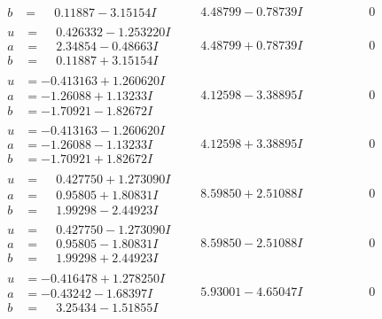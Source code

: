 \documentclass[1p]{elsarticle_modified}
\theoremstyle{definition}
\begin{document}
$$\begin{array}{c|c|c}
\begin{aligned}
b &= \phantom{-}0.11887 - 3.15154 I\end{aligned}
 & \phantom{-}4.48799 - 0.78739 I & \phantom{-0.000000 } 0 \\ \hline\begin{aligned}
u &= \phantom{-}0.426332 - 1.253220 I \\
a &= \phantom{-}2.34854 - 0.48663 I \\
b &= \phantom{-}0.11887 + 3.15154 I\end{aligned}
 & \phantom{-}4.48799 + 0.78739 I & \phantom{-0.000000 } 0 \\ \hline\begin{aligned}
u &= -0.413163 + 1.260620 I \\
a &= -1.26088 + 1.13233 I \\
b &= -1.70921 - 1.82672 I\end{aligned}
 & \phantom{-}4.12598 - 3.38895 I & \phantom{-0.000000 } 0 \\ \hline\begin{aligned}
u &= -0.413163 - 1.260620 I \\
a &= -1.26088 - 1.13233 I \\
b &= -1.70921 + 1.82672 I\end{aligned}
 & \phantom{-}4.12598 + 3.38895 I & \phantom{-0.000000 } 0 \\ \hline\begin{aligned}
u &= \phantom{-}0.427750 + 1.273090 I \\
a &= \phantom{-}0.95805 + 1.80831 I \\
b &= \phantom{-}1.99298 - 2.44923 I\end{aligned}
 & \phantom{-}8.59850 + 2.51088 I & \phantom{-0.000000 } 0 \\ \hline\begin{aligned}
u &= \phantom{-}0.427750 - 1.273090 I \\
a &= \phantom{-}0.95805 - 1.80831 I \\
b &= \phantom{-}1.99298 + 2.44923 I\end{aligned}
 & \phantom{-}8.59850 - 2.51088 I & \phantom{-0.000000 } 0 \\ \hline\begin{aligned}
u &= -0.416478 + 1.278250 I \\
a &= -0.43242 - 1.68397 I \\
b &= \phantom{-}3.25434 - 1.51855 I\end{aligned}
 & \phantom{-}5.93001 - 4.65047 I & \phantom{-0.000000 } 0 \\ \hline\begin{aligned}

\end{aligned}
\end{array}$$
\end{document}
